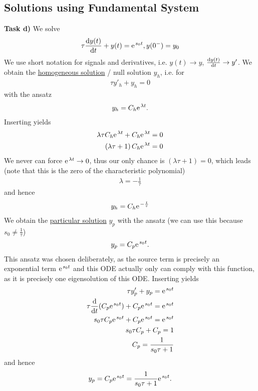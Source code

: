 \documentclass[11pt,a4paper,DIV=12]{scrartcl}
\begin{document}
\subsection{Solutions using Fundamental System}

\textbf{Task d)}
We solve
\begin{align}
\tau \frac{\fsd y(t)}{\fsd t} + y(t) = \e^{s_0 t}, y(0^-) = y_0
\end{align}
We use short notation for signals and derivatives, i.e. $y(t)\rightarrow y$, $\frac{\mathrm{d} y(t)}{\mathrm{d} t} \rightarrow y'$.
%
We obtain the \underline{homogeneous solution} / null solution $y_h$, i.e. for
\begin{align}
\tau y'_h + y_h = 0
\end{align}
with the ansatz
\begin{align}
y_h = C_h \e^{\lambda t}.
\end{align}
Inserting yields
\begin{align}
\lambda \tau C_h \e^{\lambda t} + C_h \e^{\lambda t} = 0\\
(\lambda \tau +1 ) \, C_h \e^{\lambda t} = 0
\end{align}
We never can force $\e^{\lambda t} \rightarrow 0$, thus our only chance is $(\lambda \tau + 1)=0$, which leads (note that this is the zero of the characteristic polynomial)
\begin{align}
\lambda = -\frac{1}{\tau}
\end{align}
and hence
\begin{align}
y_h = C_h \e^{- \frac{t}{\tau}}
\end{align}
%
We obtain the \underline{particular solution} $y_p$ with the ansatz (we can use this because $s_0 \neq \frac{1}{\tau}$)
\begin{align}
y_p = C_p \e^{s_0 t}.
\end{align}
%
This ansatz was chosen deliberately, as the source term is precisely an exponential term $\e^{s_0 t}$ and this ODE actually only can comply with this function, as it is precisely one eigensolution of this ODE.
%
Inserting yields
\begin{align}
\tau y'_p + y_p = \e^{s_0 t}\\
\tau \frac{\fsd}{\fsd t}(C_p \e^{s_0 t}) + C_p \e^{s_0 t} = \e^{s_0 t}\\
s_0 \tau C_p \e^{s_0 t} + C_p \e^{s_0 t} = \e^{s_0 t}\\
s_0 \tau C_p + C_p = 1\\
C_p = \frac{1}{s_0 \tau + 1}
\end{align}
and hence
\begin{align}
y_p = C_p \e^{s_0 t} = \frac{1}{s_0 \tau + 1} \e^{s_0 t}.
\end{align}
\end{document}
